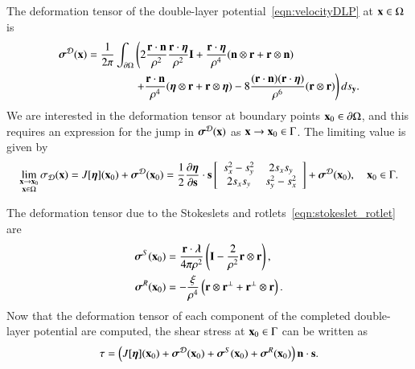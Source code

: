 \documentclass[preprint, 10pt]{elsarticle}
\begin{document}
The deformation tensor of the double-layer
potential~\eqref{eqn:velocityDLP} at ${\mathbf{x}} \in \Omega$ is
\begin{equation}
  \label{eqn:shearStressDLP}
  \begin{aligned}
  {\boldsymbol\sigma}^{\mathcal{D}}({\mathbf{x}}) = \frac{1}{2\pi}\int_{{\partial}\Omega} &\left(
    2\frac{{\mathbf{r}} \cdot {\mathbf{n}}}{\rho^2} \frac{{\mathbf{r}} \cdot {\boldsymbol\eta}}{\rho^2} {\mathbf{I}} + 
    \frac{{\mathbf{r}} \cdot {\boldsymbol\eta}}{\rho^4} ({\mathbf{n}} \otimes {\mathbf{r}} + {\mathbf{r}} \otimes {\mathbf{n}}) 
    \right. \\
    &\left.
    +\frac{{\mathbf{r}} \cdot {\mathbf{n}}}{\rho^4} ({\boldsymbol\eta} \otimes {\mathbf{r}} + {\mathbf{r}} \otimes {\boldsymbol\eta}) - 
    8\frac{({\mathbf{r}} \cdot {\mathbf{n}})({\mathbf{r}} \cdot {\boldsymbol\eta})}{\rho^6}({\mathbf{r}} \otimes {\mathbf{r}})
  \right) ds_{\mathbf{y}}.
  \end{aligned}
\end{equation}
We are interested in the deformation tensor at boundary points ${\mathbf{x}}_0
\in {\partial}\Omega$, and this requires an expression for the jump in
${\boldsymbol\sigma}^{\mathcal{D}}({\mathbf{x}})$ as ${\mathbf{x}} \rightarrow {\mathbf{x}}_0 \in \Gamma$.  The limiting
value is given by~\cite{qua-bir2014a}
\begin{align*}
  \lim_{\substack{{\mathbf{x}} \rightarrow {\mathbf{x}}_0 \\ {\mathbf{x}} \in \Omega}}\sigma_{\mathcal{D}}({\mathbf{x}}) =
  J[{\boldsymbol\eta}]({\mathbf{x}}_0) + {\boldsymbol\sigma}^{\mathcal{D}}({\mathbf{x}}_0) = 
  \frac{1}{2}\frac{\partial {\boldsymbol\eta}}{\partial {\mathbf{s}}} \cdot {\mathbf{s}}
  \left[ \begin{array}{cc}
    s_x^2 - s_y^2 & 2s_x s_y \\ 2s_x s_y & s_y^2 - s_x^2
  \end{array}\right] + {\boldsymbol\sigma}^{\mathcal{D}}({\mathbf{x}}_0), \quad {\mathbf{x}}_0 \in \Gamma.
\end{align*}

The deformation tensor due to the Stokeslets and
rotlets~\eqref{eqn:stokeslet_rotlet} are
\begin{align*}
  {\boldsymbol\sigma}^S({\mathbf{x}}_0) &= \frac{{\mathbf{r}} \cdot {\boldsymbol\lambda}}{4\pi\rho^2} \left(
    {\mathbf{I}} - \frac{2}{\rho^2} {\mathbf{r}} \otimes {\mathbf{r}} \right),  \\
  {\boldsymbol\sigma}^R({\mathbf{x}}_0) &= -\frac{\xi}{\rho^4} \left({\mathbf{r}} \otimes {\mathbf{r}}^\perp + 
                           {\mathbf{r}}^\perp \otimes {\mathbf{r}} \right).
\end{align*}
Now that the deformation tensor of each component of the completed
double-layer potential are computed, the shear stress at ${\mathbf{x}}_0 \in
\Gamma$ can be written as
\begin{align*}
  \tau = \left(J[{\boldsymbol\eta}]({\mathbf{x}}_0) + {\boldsymbol\sigma}^{\mathcal{D}}({\mathbf{x}}_0) + 
    {\boldsymbol\sigma}^S({\mathbf{x}}_0) + {\boldsymbol\sigma}^R({\mathbf{x}}_0)\right) {\mathbf{n}} \cdot {\mathbf{s}}.
\end{align*}
\end{document}
